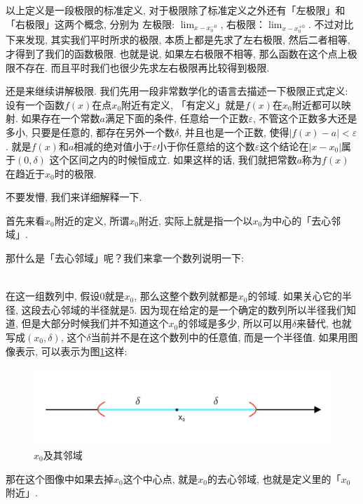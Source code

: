 以上定义是一段极限的标准定义, 对于极限除了标准定义之外还有「左极限」和「右极限」这两个概念, 分别为 左极限: $\lim_{x-x_0^{-0}}$, 右极限：$\lim_{x-x_0^{+0}}$. 不过对比下来发现, 其实我们平时所求的极限, 本质上都是先求了左右极限, 然后二者相等, 才得到了我们的函数极限. 也就是说, 如果左右极限不相等, 那么函数在这个点上极限不存在. 而且平时我们也很少先求左右极限再比较得到极限. 

还是来继续讲解极限. 我们先用一段非常数学化的语言去描述一下极限正式定义: 设有一个函数$f(x)$在点$x_0$附近有定义, 「有定义」就是$f(x)$在$x_0$附近都可以映射. 如果存在一个常数$a$满足下面的条件, 任意给一个正数$\varepsilon$, 不管这个正数多大还是多小, 只要是任意的, 都存在另外一个数$\delta$, 并且也是一个正数, 使得$|f(x)-a|<\varepsilon$. 就是$f(x)$和$a$相减的绝对值小于$\varepsilon$小于你任意给的这个数$\varepsilon$这个结论在$|x-x_0|$属于$(0, \delta)$ 这个区间之内的时候恒成立. 如果这样的话, 我们就把常数$a$称为$f(x)$在趋近于$x_0$时的极限. 

不要发懵, 我们来详细解释一下. 

首先来看$x_0$附近的定义, 所谓$x_0$附近, 实际上就是指一个以$x_0$为中心的「去心邻域」. 

那什么是「去心邻域」呢？我们来拿一个数列说明一下: 

\begin{align*}
  [-5,-4,-3,-2,-1,0,1,2,3,4,5]
\end{align*}

在这一组数列中, 假设0就是$x_0$, 那么这整个数列就都是$x_0$的邻域. 如果关心它的半径, 这段去心邻域的半径就是5. 因为现在给定的是一个确定的数列所以半径我们知道, 但是大部分时候我们并不知道这个$x_0$的邻域是多少, 所以可以用$\delta$来替代, 也就写成$(x_0, \delta)$, 这个$\delta$当前并不是在这个数列中的任意值, 而是一个半径值. 如果用图像表示, 可以表示为图\ref{fig:img8_1}这样: 

\begin{figure}[ht]
  \centering
  \includegraphics[width=1\textwidth]{asset/c1569200-3866-4cf7-8ec1-6cc23521eaff.png}
  \caption{$x_0$及其邻域}
  \label{fig:img8_1}
\end{figure}

那在这个图像中如果去掉$x_0$这个中心点, 就是$x_0$的去心邻域, 也就是定义里的「$x_0$ 附近」. 

